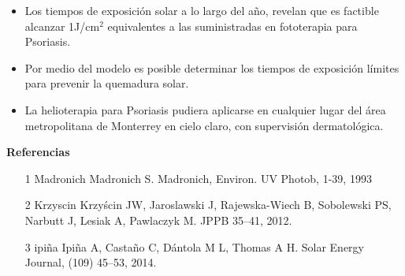 \documentclass{article}
\begin{document}
\begin{multicols}{2}
\begin{minipage}{0.22\linewidth}
\end{minipage}
\begin{minipage}{0.78\linewidth}
\begin{itemize}
    \item Los tiempos de exposición solar a lo largo del año, revelan que es factible alcanzar 1J/cm$^2$ equivalentes a las suministradas en fototerapia para Psoriasis.
    \item Por medio del modelo es posible determinar los tiempos de exposición límites para prevenir la quemadura solar.
    \item La helioterapia para Psoriasis pudiera aplicarse en cualquier lugar del área metropolitana de Monterrey en cielo claro, con supervisión dermatológica.
\end{itemize}
\end{minipage}
\begin{center}
    \begin{shaded}
    \textbf{\textcolor{na}{Referencias}}
    \end{shaded}
    \end{center}
    \changefontsizes{6pt}
    \begin{enumerate}
        \item[1]{Madronich} Madronich S. Madronich, Environ. UV Photob, 1-39, 1993
        \item[2]{Krzyscin} Krzyścin JW, Jaroslawski J, Rajewska-Wiech B, Sobolewski PS, Narbutt J, Lesiak A, Pawlaczyk M. JPPB 35–41, 2012.
        \item[3]{ipiña} Ipiña A, Castaño C, Dántola M L, Thomas A H. Solar Energy Journal, (109) 45–53, 2014.
    \end{enumerate}
\end{multicols}
\end{document}
